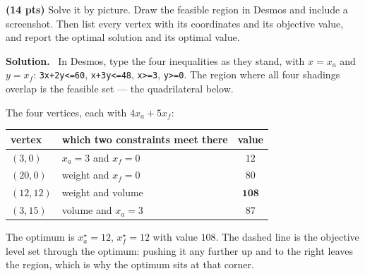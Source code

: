 \documentclass[10pt]{article}
\newenvironment{solution}
  {\par\smallskip\begingroup\color{solink}\textbf{Solution.}\ }
  {\endgroup\par}
\begin{document}
\begin{parts}
\item \textbf{(14 pts)} Solve it by picture. Draw the feasible region in Desmos and
  include a screenshot. Then list every vertex with its coordinates and its objective
  value, and report the optimal solution and its optimal value.

\begin{solution}
In Desmos, type the four inequalities as they stand, with $x = x_a$ and $y = x_f$:
\texttt{3x+2y<=60}, \texttt{x+3y<=48}, \texttt{x>=3}, \texttt{y>=0}. The region where
all four shadings overlap is the feasible set --- the quadrilateral below.
\par\medskip
\begin{center}
\end{center}
The four vertices, each with $4x_a + 5x_f$:
\begin{center}
\begin{tabular}{l|l|c}
 vertex & which two constraints meet there & value \\ \hline
 $(3,0)$   & $x_a = 3$ and $x_f = 0$              & $12$ \\
 $(20,0)$  & weight and $x_f = 0$                 & $80$ \\
 $(12,12)$ & weight and volume                    & $\mathbf{108}$ \\
 $(3,15)$  & volume and $x_a = 3$                 & $87$ \\
\end{tabular}
\end{center}
The optimum is $x_a^{\star} = 12$, $x_f^{\star} = 12$ with value $108$. The dashed
line is the objective level set through the optimum: pushing it any further up and to
the right leaves the region, which is why the optimum sits at that corner.
\end{solution}


\end{parts}
\end{document}

